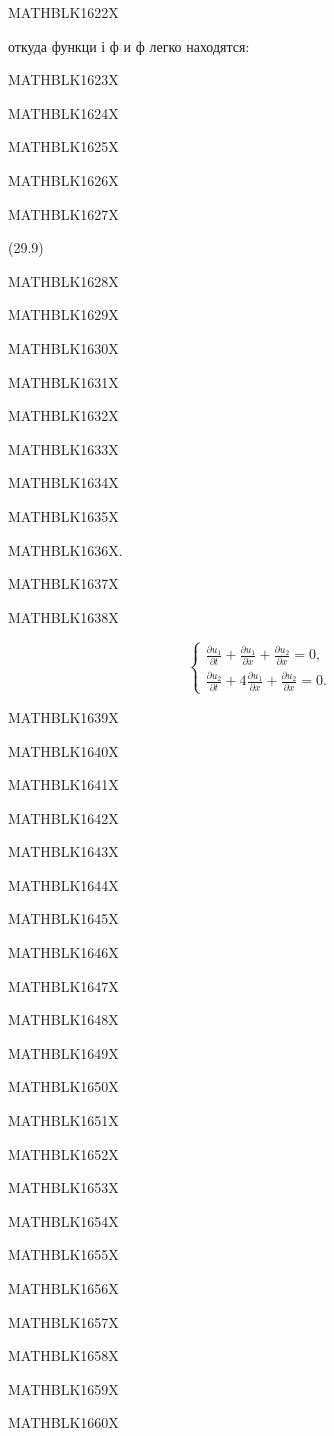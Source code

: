 \documentclass[
  ukrainian,
]{article}
\begin{document}
MATHBLK1622X

откуда функци і ф и ф легко находятся:

MATHBLK1623X

MATHBLK1624X

MATHBLK1625X

MATHBLK1626X

MATHBLK1627X

(29.9)

MATHBLK1628X

MATHBLK1629X

MATHBLK1630X

MATHBLK1631X

MATHBLK1632X

MATHBLK1633X

MATHBLK1634X

MATHBLK1635X

MATHBLK1636X.

MATHBLK1637X

MATHBLK1638X

\[
\begin{cases} \frac{\partial u_1}{\partial t} + \frac{\partial u_1}{\partial x} + \frac{\partial u_2}{\partial x} = 0, \\ \frac{\partial u_2}{\partial t} + 4 \frac{\partial u_1}{\partial x} + \frac{\partial u_2}{\partial x} = 0. \end{cases}
\]

MATHBLK1639X

MATHBLK1640X

MATHBLK1641X

MATHBLK1642X

MATHBLK1643X

MATHBLK1644X

MATHBLK1645X

MATHBLK1646X

MATHBLK1647X

MATHBLK1648X

MATHBLK1649X

MATHBLK1650X

MATHBLK1651X

MATHBLK1652X

MATHBLK1653X

MATHBLK1654X

MATHBLK1655X

MATHBLK1656X

MATHBLK1657X

MATHBLK1658X

MATHBLK1659X

MATHBLK1660X
\end{document}
